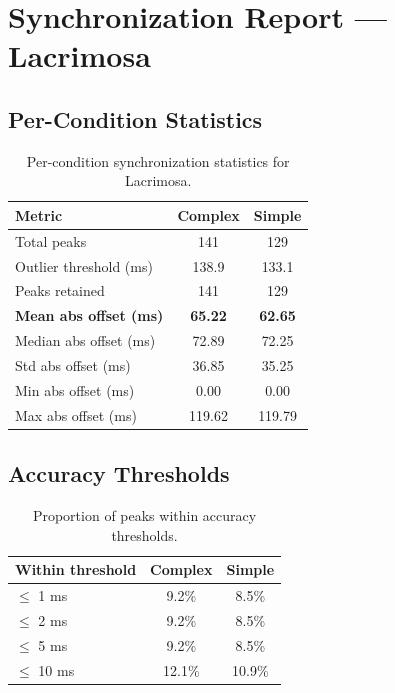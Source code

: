 
\section*{Synchronization Report --- Lacrimosa}

\subsection*{Per-Condition Statistics}

\begin{table}[h!]
\centering
\begin{tabular}{|l|c|c|}
\hline
Metric & Complex & Simple \\
\hline
Total peaks & 141 & 129 \\
Outlier threshold (ms) & 138.9 & 133.1 \\
Peaks retained & 141 & 129 \\
\textbf{Mean abs offset (ms)} & \textbf{65.22} & \textbf{62.65} \\
Median abs offset (ms) & 72.89 & 72.25 \\
Std abs offset (ms) & 36.85 & 35.25 \\
Min abs offset (ms) & 0.00 & 0.00 \\
Max abs offset (ms) & 119.62 & 119.79 \\
\hline
\end{tabular}
\caption{Per-condition synchronization statistics for Lacrimosa.}
\label{tab:sync_stats}
\end{table}

\subsection*{Accuracy Thresholds}

\begin{table}[h!]
\centering
\begin{tabular}{|l|c|c|}
\hline
Within threshold & Complex & Simple \\
\hline
$\leq$ 1 ms & 9.2\% & 8.5\% \\
$\leq$ 2 ms & 9.2\% & 8.5\% \\
$\leq$ 5 ms & 9.2\% & 8.5\% \\
$\leq$ 10 ms & 12.1\% & 10.9\% \\
\hline
\end{tabular}
\caption{Proportion of peaks within accuracy thresholds.}
\label{tab:sync_accuracy}
\end{table}

